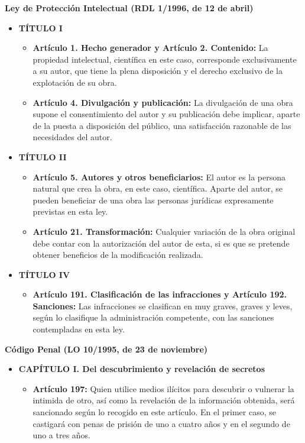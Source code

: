 \vspace{.5cm}\noindent\textbf{Ley de Protección Intelectual (RDL 1/1996, de 12 de abril)}~\cite{ministerio_de_cultura_real_1996}
\begin{itemize}
	\item \textbf{TÍTULO I}
	      \begin{itemize}
		      \item \textbf{Artículo 1. Hecho generador y Artículo 2. Contenido:} La propiedad intelectual, científica en este caso, corresponde exclusivamente a su autor, que tiene la plena disposición y el derecho exclusivo de la explotación de su obra.
		      \item \textbf{Artículo 4. Divulgación y publicación:} La divulgación de una obra supone el consentimiento del autor y su publicación debe implicar, aparte de la puesta a disposición del público, una satisfacción razonable de las necesidades del autor.
	      \end{itemize}
	\item \textbf{TÍTULO II}
	      \begin{itemize}
		      \item \textbf{Artículo 5. Autores y otros beneficiarios:} El autor es la persona natural que crea la obra, en este caso, científica. Aparte del autor, se pueden beneficiar de una obra las personas jurídicas expresamente previstas en esta ley.
		      \item \textbf{Artículo 21. Transformación:} Cualquier variación de la obra original debe contar con la autorización del autor de esta, si es que se pretende obtener beneficios de la modificación realizada.
	      \end{itemize}
	\item \textbf{TÍTULO IV}
	      \begin{itemize}
		      \item \textbf{Artículo 191. Clasificación de las infracciones y Artículo 192. Sanciones:} Las infracciones se clasifican en muy graves, graves y leves, según lo clasifique la administración competente, con las sanciones contempladas en esta ley.
	      \end{itemize}
\end{itemize}
\pagebreak

\noindent\textbf{Código Penal (LO 10/1995, de 23 de noviembre)}~\cite{jefatura_del_estado_ley_1995}
\begin{itemize}
	\item \textbf{CAPÍTULO I. Del descubrimiento y revelación de secretos}
	      \begin{itemize}
		      \item \textbf{Artículo 197:} Quien utilice medios ilícitos para descubrir o vulnerar la intimida de otro, así como la revelación de la información obtenida, será sancionado según lo recogido en este artículo. En el primer caso, se castigará con penas de prisión de uno a cuatro años y en el segundo de uno a tres años.
	      \end{itemize}
\end{itemize}

